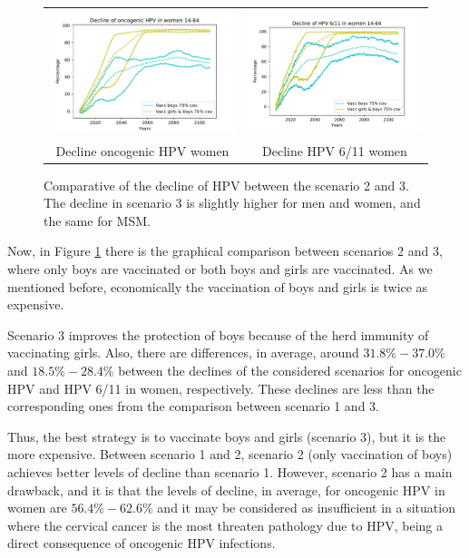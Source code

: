 \begin{figure}[!]
\begin{tabular}{cc}
		\includegraphics[width=0.5\linewidth]{IMGs/10.-Coste_efectividad/solo_hom_y_ambos/onco_muj.pdf}	& 
		\includegraphics[width=0.5\linewidth]{IMGs/10.-Coste_efectividad/solo_hom_y_ambos/verr_muj.pdf}  \\ 
		Decline oncogenic HPV women	& Decline HPV 6/11 women \\ 
	\end{tabular} 
	\caption{Comparative of the decline of HPV between the scenario 2 and 3. The decline in scenario 3 is slightly higher for men and women, and the same for MSM.}
	\label{fig:compara_2_1}
\end{figure}

Now, in Figure \ref{fig:compara_2_1} there is the graphical comparison between scenarios 2 and 3, where only boys are vaccinated or both boys and girls are vaccinated. As we mentioned before, economically the vaccination of boys and girls is twice as expensive.

Scenario 3 improves the protection of boys because of the herd immunity of vaccinating girls. Also, there are differences, in average, around $31.8\%-37.0\%$ and $18.5\%-28.4\%$ between the declines of the considered scenarios for oncogenic HPV and HPV 6/11 in women, respectively. These declines are less than the corresponding ones from the comparison between scenario 1 and 3.

Thus, the best strategy is to vaccinate boys and girls (scenario 3), but it is the more expensive. Between scenario 1 and 2, scenario 2 (only vaccination of boys) achieves better levels of decline than scenario 1. However, scenario 2 has a main drawback, and it is that the levels of decline, in average, for oncogenic HPV in women are $56.4\%-62.6\%$ and it may be considered as insufficient in a situation where the cervical cancer is the most threaten pathology due to HPV, being a direct consequence of oncogenic HPV infections.     



